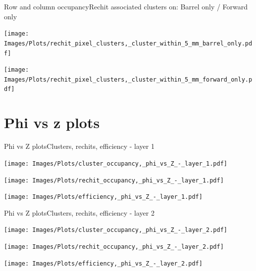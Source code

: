 \documentclass{beamer}
\begin{document}
\begin{frame}{Row and column occupancy}{Rechit associated clusters on: Barrel only / Forward only}
  \begin{minipage}{0.49\textwidth}
    \centering
    \texttt{[image: Images/Plots/rechit\_pixel\_clusters,\_cluster\_within\_5\_mm\_barrel\_only.pdf]}
  \end{minipage}%
  \hspace{0.01\textwidth}%
  \begin{minipage}{0.49\textwidth}
    \centering
    \texttt{[image: Images/Plots/rechit\_pixel\_clusters,\_cluster\_within\_5\_mm\_forward\_only.pdf]}
  \end{minipage}%
\end{frame}

\section{Phi vs z plots}

\begin{frame}{Phi vs Z plots}{Clusters, rechits, efficiency - layer 1}
  \hspace{0.01\textwidth}%
  \begin{minipage}{0.32\textwidth}
    \centering
    \texttt{[image: Images/Plots/cluster\_occupancy,\_phi\_vs\_Z\_-\_layer\_1.pdf]}
  \end{minipage}%
  \hspace{0.01\textwidth}%
  \begin{minipage}{0.32\textwidth}
    \centering
    \texttt{[image: Images/Plots/rechit\_occupancy,\_phi\_vs\_Z\_-\_layer\_1.pdf]}
  \end{minipage}
  \vspace*{0.2cm}
  \begin{minipage}{0.32\textwidth}
    \centering
    \texttt{[image: Images/Plots/efficiency,\_phi\_vs\_Z\_-\_layer\_1.pdf]}
  \end{minipage}%
\end{frame}

\begin{frame}{Phi vs Z plots}{Clusters, rechits, efficiency - layer 2}
  \hspace{0.01\textwidth}%
  \begin{minipage}{0.32\textwidth}
    \centering
    \texttt{[image: Images/Plots/cluster\_occupancy,\_phi\_vs\_Z\_-\_layer\_2.pdf]}
  \end{minipage}%
  \hspace{0.01\textwidth}%
  \begin{minipage}{0.32\textwidth}
    \centering
    \texttt{[image: Images/Plots/rechit\_occupancy,\_phi\_vs\_Z\_-\_layer\_2.pdf]}
  \end{minipage}
  \vspace*{0.2cm}
  \begin{minipage}{0.32\textwidth}
    \centering
    \texttt{[image: Images/Plots/efficiency,\_phi\_vs\_Z\_-\_layer\_2.pdf]}
  \end{minipage}%
\end{frame}
\end{document}
